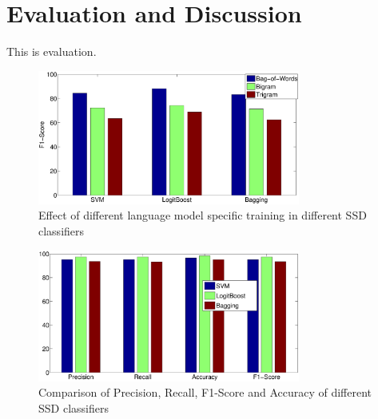 \section{Evaluation and Discussion}
\label{sec:evaluation}
This is evaluation.

\begin{figure}[hbt]
\centering
\includegraphics[width=3.4in, height= 2.4 in]{./figs/bow.eps}
\caption{Effect of different language model specific training in different SSD classifiers}
\label{train:fig}
\end{figure}

\begin{figure}[hbt]
\centering
\includegraphics[width=3.4in, height= 2.4 in]{./figs/class.eps}
\caption{Comparison of Precision, Recall, F1-Score and Accuracy of different SSD classifiers}
\label{train:fig}
\end{figure}

